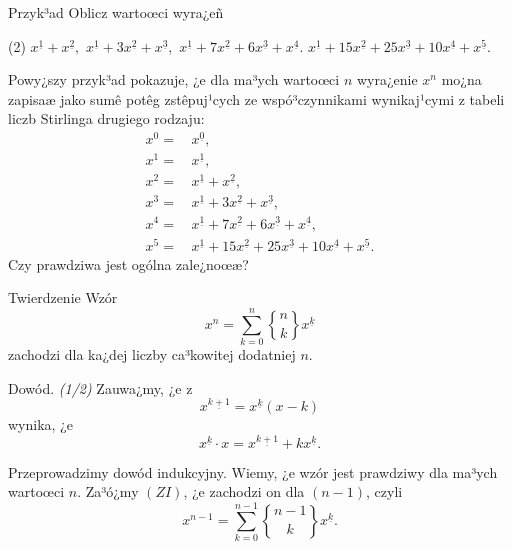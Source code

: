 \documentclass[a4paper,10pt]{beamer}
\begin{document}
\begin{frame}
\begin{exampleblock}{Przyk³ad}
Oblicz wartoœci wyra¿eñ
\begin{tasks}(2)
\task $x^\underline{1}+x^\underline{2},$
\task $x^\underline{1}+3x^\underline{2}+x^\underline{3},$
\task $x^\underline{1}+7x^\underline{2}+6x^\underline{3}+x^\underline{4}.$
\task $x^\underline{1}+15x^\underline{2}+25x^\underline{3}+10x^\underline{4}+x^\underline5.$
\end{tasks}
\end{exampleblock}

\bigskip

Powy¿szy przyk³ad pokazuje, ¿e dla ma³ych wartoœci $n$ wyra¿enie $x^n$ mo¿na zapisaæ jako sumê potêg zstêpuj¹cych ze wspó³czynnikami wynikaj¹cymi z tabeli liczb Stirlinga drugiego rodzaju:
\begin{align*}
x^0=&\,x^\underline0,\\
x^1=&\,x^\underline1,\\
x^2=&\,x^\underline1+x^\underline2,\\
x^3=&\,x^\underline1+3x^\underline2+x^\underline3,\\
x^4=&\,x^\underline1+7x^\underline2+6x^\underline3+x^\underline4,\\
x^5=&\,x^\underline{1}+15x^\underline{2}+25x^\underline{3}+10x^\underline{4}+x^\underline5.
\end{align*}
Czy prawdziwa jest ogólna zale¿noœæ?
\end{frame}


\begin{frame}
\begin{block}{Twierdzenie}
Wzór
$$x^n=\sum\limits_{k=0}^n{n\brace k}x^\underline{k}$$
zachodzi dla ka¿dej liczby ca³kowitej dodatniej $n$. 
\end{block}

\begin{block}{Dowód. {\it(1/2)}}
Zauwa¿my, ¿e z $$x^\underline{k+1}=x^\underline{k}(x-k)$$ wynika, ¿e $$x^\underline{k}\cdot x=x^{\underline{k+1}}+kx^\underline{k}.$$

Przeprowadzimy dowód indukcyjny. Wiemy, ¿e wzór jest prawdziwy dla ma³ych wartoœci $n$. Za³ó¿my $(ZI)$, ¿e zachodzi on dla $(n-1)$, czyli
$$x^{n-1}=\sum\limits_{k=0}^{n-1}{n-1\brace k}x^\underline{k}.$$
\end{block}
\end{frame}
\end{document}
